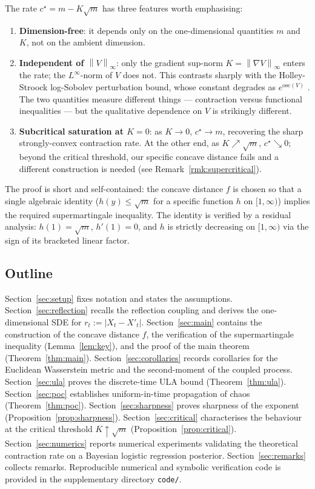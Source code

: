 \documentclass[11pt]{article}
\theoremstyle{definition}
\newcommand{\norm}[1]{\left\lVert #1 \right\rVert}
\newcommand{\abs}[1]{\left\lvert #1 \right\rvert}
\begin{document}
The rate $c^\star = m - K\sqrt{m}$ has three features worth emphasising:
\begin{enumerate}
  \item \textbf{Dimension-free}: it depends only on the one-dimensional quantities $m$ and $K$, not on the ambient dimension.
  \item \textbf{Independent of $\norm{V}_\infty$}: only the gradient sup-norm $K = \norm{\nabla V}_\infty$ enters the rate; the $L^\infty$-norm of $V$ does not. This contrasts sharply with the Holley-Stroock log-Sobolev perturbation bound, whose constant degrades as $e^{\mathrm{osc}(V)}$ \cite{HolleyStroock1987}. The two quantities measure different things — contraction versus functional inequalities — but the qualitative dependence on $V$ is strikingly different.
  \item \textbf{Subcritical saturation at $K=0$}: as $K\to 0$, $c^\star \to m$, recovering the sharp strongly-convex contraction rate. At the other end, as $K \nearrow \sqrt m$, $c^\star \searrow 0$; beyond the critical threshold, our specific concave distance fails and a different construction is needed (see Remark~\ref{rmk:supercritical}).
\end{enumerate}

The proof is short and self-contained: the concave distance $f$ is chosen so that a single algebraic identity ($h(y) \le \sqrt m$ for a specific function $h$ on $[1,\infty)$) implies the required supermartingale inequality. The identity is verified by a residual analysis: $h(1) = \sqrt m$, $h'(1) = 0$, and $h$ is strictly decreasing on $[1,\infty)$ via the sign of its bracketed linear factor.

\subsection{Outline}
Section~\ref{sec:setup} fixes notation and states the assumptions. Section~\ref{sec:reflection} recalls the reflection coupling and derives the one-dimensional SDE for $r_t := \abs{X_t - X'_t}$. Section~\ref{sec:main} contains the construction of the concave distance $f$, the verification of the supermartingale inequality (Lemma~\ref{lem:key}), and the proof of the main theorem (Theorem~\ref{thm:main}). Section~\ref{sec:corollaries} records corollaries for the Euclidean Wasserstein metric and the second-moment of the coupled process. Section~\ref{sec:ula} proves the discrete-time ULA bound (Theorem~\ref{thm:ula}). Section~\ref{sec:poc} establishes uniform-in-time propagation of chaos (Theorem~\ref{thm:poc}). Section~\ref{sec:sharpness} proves sharpness of the exponent (Proposition~\ref{prop:sharpness}). Section~\ref{sec:critical} characterises the behaviour at the critical threshold $K \uparrow \sqrt m$ (Proposition~\ref{prop:critical}). Section~\ref{sec:numerics} reports numerical experiments validating the theoretical contraction rate on a Bayesian logistic regression posterior. Section~\ref{sec:remarks} collects remarks. Reproducible numerical and symbolic verification code is provided in the supplementary directory \texttt{code/}.
\end{document}
